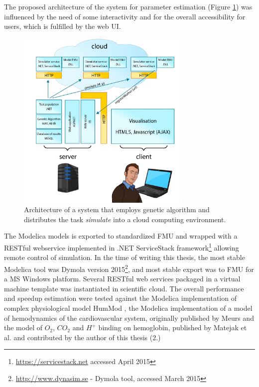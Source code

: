 The proposed architecture of the system for parameter estimation (Figure  \ref{fig:architectureestimation}) was influenced by the need of some interactivity and for the overall accessibility for users, which is fulfilled by the web UI. 

\begin{figure}[hbt]
    \centering
     \includegraphics[width=0.75\textwidth]{../img/chapter3-architekturaestimation-01.png}  
    \caption{Architecture of a system that employs genetic algorithm and distributes the task \emph{simulate} into a cloud computing environment.}
    \label{fig:architectureestimation}
\end{figure}

The Modelica models is exported to standardized FMU and wrapped with a RESTful webservice implemented in .NET ServiceStack framework\footnote{\url{https://servicestack.net} accessed April 2015} allowing remote control of simulation. In the time of writing this thesis, the most stable Modelica tool was Dymola version 2015\footnote{\url{http://www.dynasim.se} - Dymola tool, accessed March 2015}, and most stable export was to FMU for a MS Windows platform. Several RESTful web services packaged in a virtual machine template was instantiated in scientific cloud.
The overall performance and speedup estimation were tested against the Modelica implementation of complex physiological model HumMod \cite{Kofranek2011hummod}, the Modelica implementation of a model of hemodynamics of the cardiovascular system, originally published by Meurs \cite{Meurs2011} and the model of $O_2$, $CO_2$ and $H^+$ binding on hemoglobin, published by Matejak et al. and contributed by the author of this thesis (2.)%


